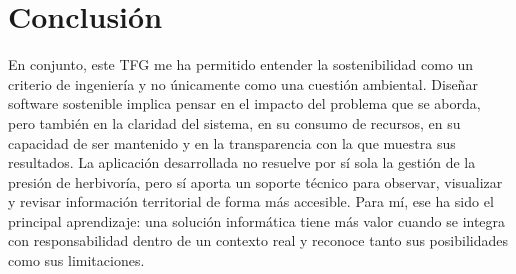 \section{Conclusión}

En conjunto, este TFG me ha permitido entender la sostenibilidad como un criterio de ingeniería y no únicamente como una cuestión ambiental. Diseñar software sostenible implica pensar en el impacto del problema que se aborda, pero también en la claridad del sistema, en su consumo de recursos, en su capacidad de ser mantenido y en la transparencia con la que muestra sus resultados. La aplicación desarrollada no resuelve por sí sola la gestión de la presión de herbivoría, pero sí aporta un soporte técnico para observar, visualizar y revisar información territorial de forma más accesible. Para mí, ese ha sido el principal aprendizaje: una solución informática tiene más valor cuando se integra con responsabilidad dentro de un contexto real y reconoce tanto sus posibilidades como sus limitaciones.